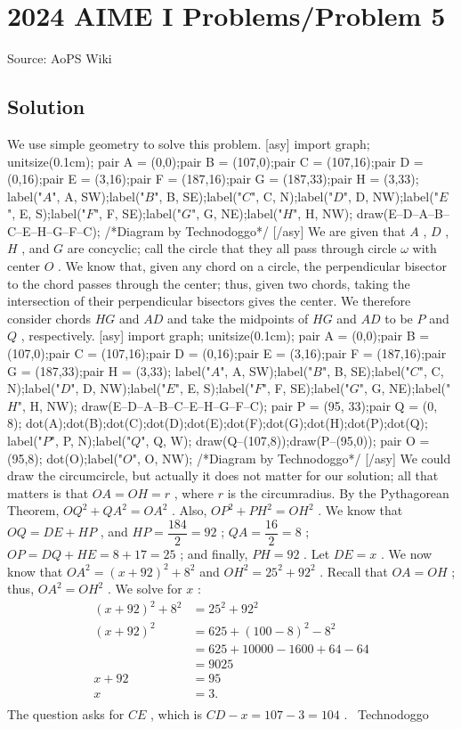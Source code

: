 \documentclass[12pt]{article}
\begin{document}
\section*{{2024 AIME I Problems/Problem 5}}
Source: AoPS Wiki

\subsection*{Solution}
We use simple geometry to solve this problem. [asy] import graph; unitsize(0.1cm); pair A = (0,0);pair B = (107,0);pair C = (107,16);pair D = (0,16);pair E = (3,16);pair F = (187,16);pair G = (187,33);pair H = (3,33); label("$A$", A, SW);label("$B$", B, SE);label("$C$", C, N);label("$D$", D, NW);label("$E$", E, S);label("$F$", F, SE);label("$G$", G, NE);label("$H$", H, NW); draw(E--D--A--B--C--E--H--G--F--C); /*Diagram by Technodoggo*/ [/asy] We are given that $A$ , $D$ , $H$ , and $G$ are concyclic; call the circle that they all pass through circle $\omega$ with center $O$ . We know that, given any chord on a circle, the perpendicular bisector to the chord passes through the center; thus, given two chords, taking the intersection of their perpendicular bisectors gives the center. We therefore consider chords $HG$ and $AD$ and take the midpoints of $HG$ and $AD$ to be $P$ and $Q$ , respectively. [asy] import graph; unitsize(0.1cm); pair A = (0,0);pair B = (107,0);pair C = (107,16);pair D = (0,16);pair E = (3,16);pair F = (187,16);pair G = (187,33);pair H = (3,33); label("$A$", A, SW);label("$B$", B, SE);label("$C$", C, N);label("$D$", D, NW);label("$E$", E, S);label("$F$", F, SE);label("$G$", G, NE);label("$H$", H, NW); draw(E--D--A--B--C--E--H--G--F--C); pair P = (95, 33);pair Q = (0, 8); dot(A);dot(B);dot(C);dot(D);dot(E);dot(F);dot(G);dot(H);dot(P);dot(Q); label("$P$", P, N);label("$Q$", Q, W); draw(Q--(107,8));draw(P--(95,0)); pair O = (95,8); dot(O);label("$O$", O, NW); /*Diagram by Technodoggo*/ [/asy] We could draw the circumcircle, but actually it does not matter for our solution; all that matters is that $OA=OH=r$ , where $r$ is the circumradius. By the Pythagorean Theorem, $OQ^2+QA^2=OA^2$ . Also, $OP^2+PH^2=OH^2$ . We know that $OQ=DE+HP$ , and $HP=\dfrac{184}2=92$ ; $QA=\dfrac{16}2=8$ ; $OP=DQ+HE=8+17=25$ ; and finally, $PH=92$ . Let $DE=x$ . We now know that $OA^2=(x+92)^2+8^2$ and $OH^2=25^2+92^2$ . Recall that $OA=OH$ ; thus, $OA^2=OH^2$ . We solve for $x$ : \begin{align*}
(x+92)^2+8^2&=25^2+92^2 \\
(x+92)^2&=625+(100-8)^2-8^2 \\
&=625+10000-1600+64-64 \\
&=9025 \\
x+92&=95 \\
x&=3. \\
\end{align*} The question asks for $CE$ , which is $CD-x=107-3=\boxed{104}$ . ~Technodoggo
\end{document}
